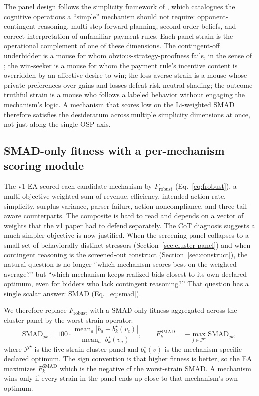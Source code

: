 \documentclass[12pt]{article}
\newcommand{\EA}{EA}
\begin{document}
The panel design follows the simplicity framework of
\citet{li2024simple}, which catalogues the cognitive operations a
``simple'' mechanism should not require: opponent-contingent
reasoning, multi-step forward planning, second-order beliefs, and
correct interpretation of unfamiliar payment rules. Each panel
strain is the operational complement of one of these dimensions.
The contingent-off underbidder is a mouse for whom
obvious-strategy-proofness fails, in the sense of \citet{li2017};
the win-seeker is a mouse for whom the payment rule's incentive
content is overridden by an affective desire to win; the
loss-averse strain is a mouse whose private preferences over
gains and losses defeat risk-neutral shading; the
outcome-truthful strain is a mouse who follows a labeled behavior
without engaging the mechanism's logic. A mechanism that scores
low on the Li-weighted SMAD therefore satisfies the
\citet{li2024simple} desideratum across multiple simplicity
dimensions at once, not just along the single OSP axis.

\subsection{SMAD-only fitness with a per-mechanism scoring module}
\label{sec:smad-fitness}

The v1 \EA{} scored each candidate mechanism by $F_{\mathrm{robust}}$
(Eq.~\eqref{eq:frobust}), a multi-objective weighted sum of revenue,
efficiency, intended-action rate, simplicity, surplus-variance,
parser-failure, action-noncompliance, and three tail-aware
counterparts. The composite is hard to read and depends on a vector
of weights that the v1 paper had to defend separately. The CoT
diagnosis suggests a much simpler objective is now justified. When
the screening panel collapses to a small set of behaviorally distinct
stressors (Section~\ref{sec:cluster-panel}) and when contingent
reasoning is the screened-out construct (Section~\ref{sec:construct}),
the natural question is no longer ``which mechanism scores best on
the weighted average?'' but ``which mechanism keeps realized bids
closest to its own declared optimum, even for bidders who lack
contingent reasoning?'' That question has a single scalar answer:
SMAD (Eq.~\eqref{eq:smad}).

We therefore replace $F_{\mathrm{robust}}$ with a SMAD-only fitness
aggregated across the cluster panel by the worst-strain operator:
\begin{equation}
\mathrm{SMAD}_{jk}
=
100 \cdot
\frac{\operatorname{mean}_a |b_a - b^\star_k(v_a)|}
     {\operatorname{mean}_a |b^\star_k(v_a)|},
\qquad
F^{\mathrm{SMAD}}_k
=
-\max_{j \in \mathcal{P}^{\star}} \mathrm{SMAD}_{jk},
\label{eq:smad-fitness}
\end{equation}
where $\mathcal{P}^{\star}$ is the five-strain cluster panel and
$b^\star_k(v)$ is the mechanism-specific declared optimum. The sign
convention is that higher fitness is better, so the \EA{} maximizes
$F^{\mathrm{SMAD}}_k$ which is the negative of the worst-strain
SMAD. A mechanism wins only if every strain in the panel ends up
close to that mechanism's own optimum.
\end{document}
